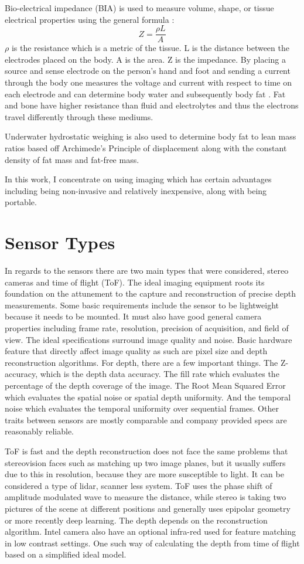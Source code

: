 Bio-electrical impedance (BIA) is used to measure volume, shape, or tissue electrical properties using the general formula \cite{jaffrin2008body}:
\begin{equation}
	Z = \frac{\rho L}{A}
\end{equation}
$\rho$ is the resistance which is a metric of the tissue. L is the distance between the electrodes placed on the body. A is the area. Z is the impedance. By placing a source and sense electrode on the person's hand and foot and sending a current through the body one measures the voltage and current with respect to time on each electrode and can determine body water and subsequently body fat \cite{khalil2014theory}. Fat and bone have higher resistance than fluid and electrolytes and thus the electrons travel differently through these mediums.

Underwater hydrostatic weighing is also used to determine body fat to lean mass ratios based off Archimede's Principle of displacement along with the constant density of fat mass and fat-free mass.

In this work, I concentrate on using imaging which has certain advantages including being non-invasive and relatively inexpensive, along with being portable.
\section{Sensor Types}
In regards to the sensors there are two main types that were considered, stereo cameras and time of flight (ToF). The ideal imaging equipment roots its foundation on the attunement to the capture and reconstruction of precise depth measurements. Some basic requirements include the sensor to be lightweight because it needs to be mounted. It must also have good general camera properties including frame rate, resolution, precision of
acquisition, and field of view. The ideal specifications surround image quality and noise. Basic hardware feature that directly affect image quality as such are pixel size and depth reconstruction algorithms. For depth, there
are a few important things. The Z-accuracy, which is the depth data accuracy. The fill rate which
evaluates the percentage of the depth coverage of the image. The Root Mean Squared Error which evaluates the
spatial noise or spatial depth uniformity. And the temporal noise which evaluates the temporal
uniformity over sequential frames. Other traits between sensors are mostly comparable and
company provided specs are reasonably reliable.

ToF is fast and the depth reconstruction does not face the same problems that stereovision faces such as matching up two image planes, but it usually suffers due to this in resolution, because they are more susceptible to light. It can be considered a type of lidar, scanner less system. ToF uses the phase shift of amplitude modulated wave to measure the distance, while stereo is taking two pictures of the scene at different positions and generally uses epipolar geometry or more recently deep learning. The depth depends on the reconstruction algorithm. Intel camera also have an optional infra-red used for feature matching in low contrast settings. One such way of calculating the depth from time of flight based on a simplified ideal model.

